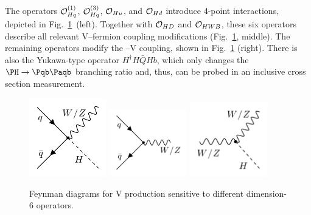 \documentclass[a4paper,11pt]{article}
\newcommand{\Pb}{{{\Pqb}}\xspace}
\newcommand{\PAb}{{{{\Paqb}}}\xspace}
\renewcommand{\PV}{{{{V}}}\xspace}
\newcommand{\VH}{{{\PV}{\PH}}\xspace}
\begin{document}
The operators ${\cal O}^{(1)}_{Hq}$, ${\cal O}^{(3)}_{Hq}$, ${\cal O}_{Hu}$, and ${\cal O}_{Hd}$ introduce 4-point interactions, depicted in Fig.~\ref{fig:Feynman_digarams}~(left). 
Together with ${\cal O}_{HD}$ and ${\cal O}_{HWB}$, these six operators describe all relevant {\PV}--fermion coupling modifications (Fig.~\ref{fig:Feynman_digarams}, middle). 
The remaining operators modify the \PH--\PV coupling, shown in Fig.~\ref{fig:Feynman_digarams} (right). 
There is also the Yukawa-type operator $H^\dagger H \bar{Q}H b$, which only changes the $\PH \to \Pb \PAb$ branching ratio and, thus, can be probed in an inclusive cross section measurement. 
\begin{figure}[hbtp]
\begin{center}
\includegraphics[width=0.3\textwidth]{Figures/New/LHE//qqVH.png}
\includegraphics[width=0.3\textwidth]{Figures/New/LHE//qqV.png}
\includegraphics[width=0.3\textwidth]{Figures/New/LHE//VVh.png}
\end{center}
\caption{
Feynman diagrams for \VH production sensitive to different dimension-6 operators.
}
\label{fig:Feynman_digarams}
\end{figure}
\end{document}
